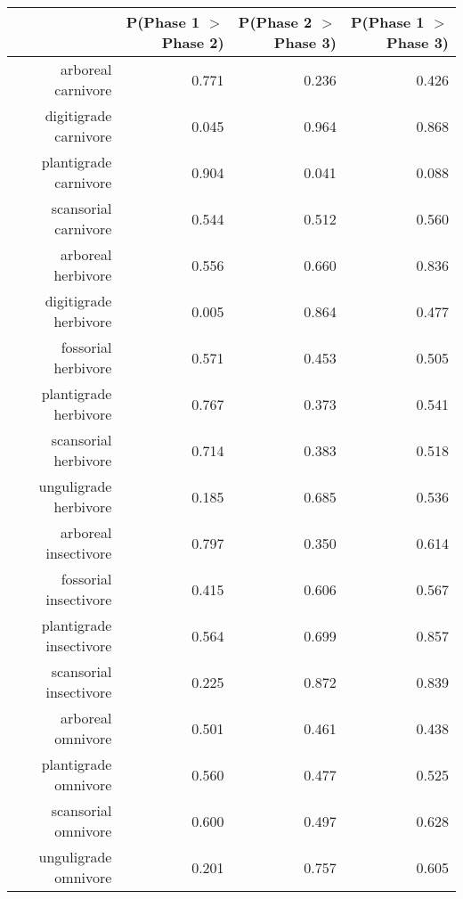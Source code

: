 \begin{table}[ht]
\centering
\begin{tabular}{rrrr}
  \hline
 & P(Phase 1 $>$ Phase 2) & P(Phase 2 $>$ Phase 3) & P(Phase 1 $>$ Phase 3) \\ 
  \hline
arboreal carnivore & 0.771 & 0.236 & 0.426 \\ 
  digitigrade carnivore & 0.045 & 0.964 & 0.868 \\ 
  plantigrade carnivore & 0.904 & 0.041 & 0.088 \\ 
  scansorial carnivore & 0.544 & 0.512 & 0.560 \\ 
  arboreal herbivore & 0.556 & 0.660 & 0.836 \\ 
  digitigrade herbivore & 0.005 & 0.864 & 0.477 \\ 
  fossorial herbivore & 0.571 & 0.453 & 0.505 \\ 
  plantigrade herbivore & 0.767 & 0.373 & 0.541 \\ 
  scansorial herbivore & 0.714 & 0.383 & 0.518 \\ 
  unguligrade herbivore & 0.185 & 0.685 & 0.536 \\ 
  arboreal insectivore & 0.797 & 0.350 & 0.614 \\ 
  fossorial insectivore & 0.415 & 0.606 & 0.567 \\ 
  plantigrade insectivore & 0.564 & 0.699 & 0.857 \\ 
  scansorial insectivore & 0.225 & 0.872 & 0.839 \\ 
  arboreal omnivore & 0.501 & 0.461 & 0.438 \\ 
  plantigrade omnivore & 0.560 & 0.477 & 0.525 \\ 
  scansorial omnivore & 0.600 & 0.497 & 0.628 \\ 
  unguligrade omnivore & 0.201 & 0.757 & 0.605 \\ 
   \hline
\end{tabular}
\label{tab:surv_plant}
\end{table}
